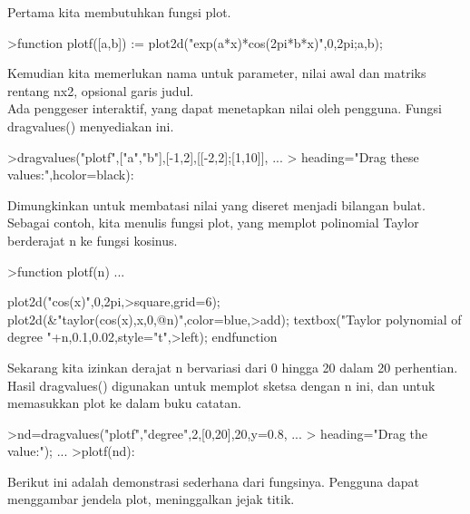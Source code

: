 \documentclass{article}
\begin{document}
\begin{eulernotebook}
\begin{eulercomment}
\begin{eulercomment}
\begin{eulercomment}
\begin{eulercomment}
\begin{eulercomment}
\begin{eulercomment}
\begin{eulercomment}
Pertama  kita  membutuhkan  fungsi  plot.
\end{eulercomment}
\begin{eulerprompt}
>function plotf([a,b]) := plot2d("exp(a*x)*cos(2pi*b*x)",0,2pi;a,b);
\end{eulerprompt}
\begin{eulercomment}
Kemudian  kita  memerlukan  nama  untuk  parameter,  nilai  awal  dan
matriks  rentang  nx2,  opsional  garis  judul.\\
Ada  penggeser  interaktif,  yang  dapat  menetapkan  nilai  oleh
pengguna.  Fungsi  dragvalues()  menyediakan  ini.
\end{eulercomment}
\begin{eulerprompt}
>dragvalues("plotf",["a","b"],[-1,2],[[-2,2];[1,10]], ...
>  heading="Drag these values:",hcolor=black):
\end{eulerprompt}
\begin{eulercomment}
Dimungkinkan  untuk  membatasi  nilai  yang  diseret  menjadi
bilangan  bulat.  Sebagai  contoh,  kita  menulis  fungsi  plot,  yang
memplot polinomial  Taylor  berderajat  n  ke  fungsi  kosinus.
\end{eulercomment}
\begin{eulerprompt}
>function plotf(n) ...
\end{eulerprompt}
\begin{eulerudf}
  plot2d("cos(x)",0,2pi,>square,grid=6);
  plot2d(&"taylor(cos(x),x,0,@n)",color=blue,>add);
  textbox("Taylor polynomial of degree "+n,0.1,0.02,style="t",>left);
  endfunction
\end{eulerudf}
\begin{eulercomment}
Sekarang  kita  izinkan  derajat  n  bervariasi  dari  0  hingga  20
dalam  20  perhentian.  Hasil  dragvalues()  digunakan  untuk  memplot
sketsa dengan  n  ini,  dan  untuk  memasukkan  plot  ke  dalam  buku
catatan.
\end{eulercomment}
\begin{eulerprompt}
>nd=dragvalues("plotf","degree",2,[0,20],20,y=0.8, ...
>   heading="Drag the value:"); ...
>plotf(nd):
\end{eulerprompt}
\begin{eulercomment}
Berikut  ini  adalah  demonstrasi  sederhana  dari  fungsinya.
Pengguna dapat  menggambar  jendela  plot,  meninggalkan  jejak
titik.
\end{eulercomment}

\end{eulercomment}
\end{eulercomment}
\end{eulercomment}
\end{eulercomment}
\end{eulercomment}
\end{eulercomment}
\end{eulernotebook}
\end{document}
